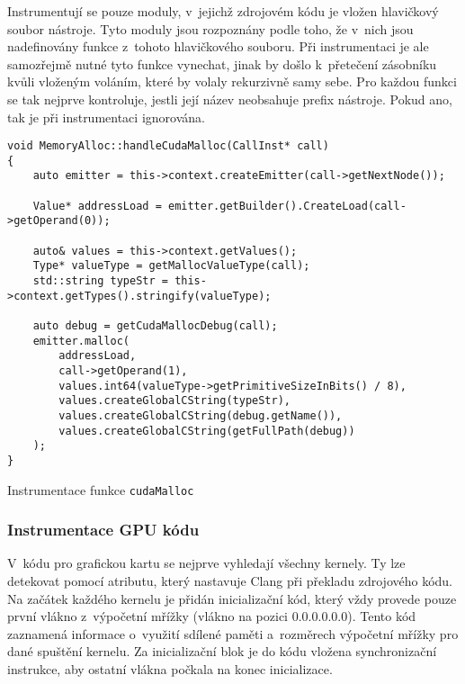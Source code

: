 Instrumentují se pouze moduly, v~jejichž zdrojovém kódu je vložen hlavičkový soubor nástroje. Tyto moduly jsou rozpoznány podle toho, že v~nich jsou nadefinovány funkce z~tohoto hla\-vičkového souboru. Při instrumentaci je ale samozřejmě nutné tyto funkce vynechat, jinak by došlo k~přetečení zásobníku kvůli vloženým voláním, které by volaly rekurzivně samy sebe. Pro každou funkci se tak nejprve kontroluje, jestli její název neobsahuje prefix nástroje. Pokud ano, tak je při instrumentaci ignorována.

\begin{listing}
\begin{verbatim}
void MemoryAlloc::handleCudaMalloc(CallInst* call)
{
	auto emitter = this->context.createEmitter(call->getNextNode());
	
	Value* addressLoad = emitter.getBuilder().CreateLoad(call->getOperand(0));
	
	auto& values = this->context.getValues();
	Type* valueType = getMallocValueType(call);
	std::string typeStr = this->context.getTypes().stringify(valueType);

	auto debug = getCudaMallocDebug(call);
	emitter.malloc(
		addressLoad,
		call->getOperand(1),
		values.int64(valueType->getPrimitiveSizeInBits() / 8),
		values.createGlobalCString(typeStr),
		values.createGlobalCString(debug.getName()),
		values.createGlobalCString(getFullPath(debug))
	);
}
\end{verbatim}
\caption{Instrumentace funkce \texttt{cudaMalloc}}
\label{code:cudamallocinstrument}
\end{listing}
 
\subsubsection*{Instrumentace GPU kódu}
V~kódu pro grafickou kartu se nejprve vyhledají všechny kernely. Ty lze detekovat pomocí atributu, který nastavuje Clang při překladu zdrojového kódu. Na začátek každého kernelu je přidán inicializační kód, který vždy provede pouze první vlákno z~výpočetní mřížky (vlákno na pozici $0.0.0.0.0.0$). Tento kód zaznamená informace o~využití sdílené paměti a~rozměrech výpočetní mřížky pro dané spuštění kernelu. Za inicializační blok je do kódu vložena synchronizační instrukce, aby ostatní vlákna počkala na konec inicializace.

